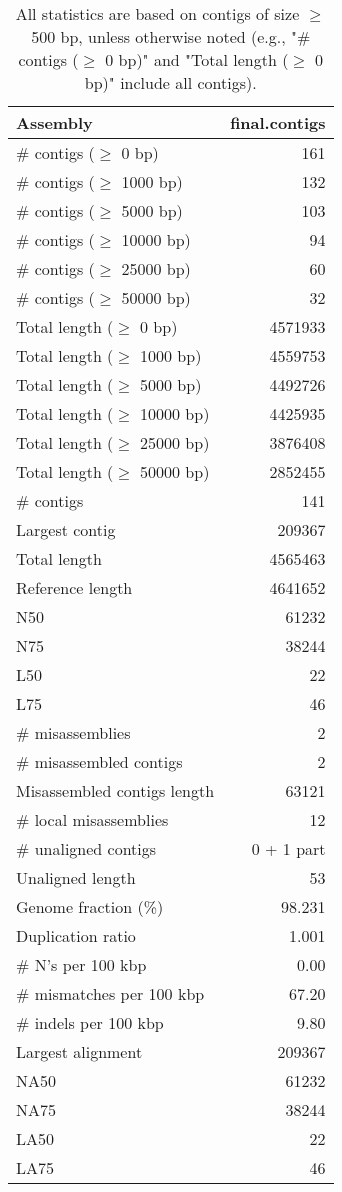 \documentclass[12pt,a4paper]{article}
\begin{document}
\begin{table}[ht]
\begin{center}
\caption{All statistics are based on contigs of size $\geq$ 500 bp, unless otherwise noted (e.g., "\# contigs ($\geq$ 0 bp)" and "Total length ($\geq$ 0 bp)" include all contigs).}
\begin{tabular}{|l*{1}{|r}|}
\hline
Assembly & final.contigs \\ \hline
\# contigs ($\geq$ 0 bp) & 161 \\ \hline
\# contigs ($\geq$ 1000 bp) & 132 \\ \hline
\# contigs ($\geq$ 5000 bp) & 103 \\ \hline
\# contigs ($\geq$ 10000 bp) & 94 \\ \hline
\# contigs ($\geq$ 25000 bp) & 60 \\ \hline
\# contigs ($\geq$ 50000 bp) & 32 \\ \hline
Total length ($\geq$ 0 bp) & 4571933 \\ \hline
Total length ($\geq$ 1000 bp) & 4559753 \\ \hline
Total length ($\geq$ 5000 bp) & 4492726 \\ \hline
Total length ($\geq$ 10000 bp) & 4425935 \\ \hline
Total length ($\geq$ 25000 bp) & 3876408 \\ \hline
Total length ($\geq$ 50000 bp) & 2852455 \\ \hline
\# contigs & 141 \\ \hline
Largest contig & 209367 \\ \hline
Total length & 4565463 \\ \hline
Reference length & 4641652 \\ \hline
N50 & 61232 \\ \hline
N75 & 38244 \\ \hline
L50 & 22 \\ \hline
L75 & 46 \\ \hline
\# misassemblies & 2 \\ \hline
\# misassembled contigs & 2 \\ \hline
Misassembled contigs length & 63121 \\ \hline
\# local misassemblies & 12 \\ \hline
\# unaligned contigs & 0 + 1 part \\ \hline
Unaligned length & 53 \\ \hline
Genome fraction (\%) & 98.231 \\ \hline
Duplication ratio & 1.001 \\ \hline
\# N's per 100 kbp & 0.00 \\ \hline
\# mismatches per 100 kbp & 67.20 \\ \hline
\# indels per 100 kbp & 9.80 \\ \hline
Largest alignment & 209367 \\ \hline
NA50 & 61232 \\ \hline
NA75 & 38244 \\ \hline
LA50 & 22 \\ \hline
LA75 & 46 \\ \hline
\end{tabular}
\end{center}
\end{table}
\end{document}
